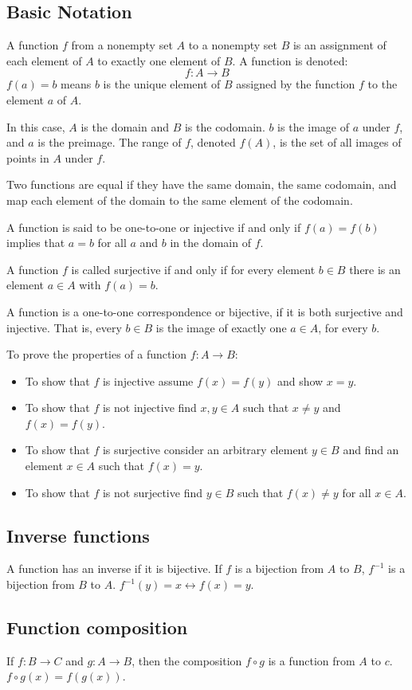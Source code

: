 \subsection{Basic Notation}
A function \(f\) from a nonempty set \(A\) to a nonempty set \(B\) is an assignment of each element of \(A\) to exactly one element of \(B\). A function is denoted:
\begin{equation*}
    f: A \rightarrow B
\end{equation*}
\(f(a) = b\) means \(b\) is the unique element of \(B\) assigned by the function \(f\) to the element \(a\) of \(A\).

In this case, \(A\) is the domain and \(B\) is the codomain. \(b\) is the image of \(a\) under \(f\), and \(a\) is the preimage. The range of \(f\), denoted \(f(A)\), is the set of all images of points in \(A\) under \(f\).

Two functions are equal if they have the same domain, the same codomain, and map each element of the domain to the same element of the codomain.

A function is said to be one-to-one or injective if and only if \(f(a) = f(b)\) implies that \(a = b\) for all \(a\) and \(b\) in the domain of \(f\).

A function \(f\) is called surjective if and only if for every element \(b \in B\) there is an element \(a \in A\) with \(f(a) = b\).

A function is a one-to-one correspondence or bijective, if it is both surjective and injective. That is, every \(b \in B\) is the image of exactly one \(a \in A\), for every \(b\).

To prove the properties of a function \(f: A \rightarrow B\):
\begin{itemize}
    \item To show that \(f\) is injective assume \(f(x) = f(y)\) and show \(x = y\).
    \item To show that \(f\) is not injective find \(x, y \in A\) such that \(x \neq y\) and \(f(x) = f(y)\).
    \item To show that \(f\) is surjective consider an arbitrary element \(y \in B\) and find an element \(x \in A\) such that \(f(x) = y\).
    \item To show that \(f\) is not surjective find \(y \in B\) such that \(f(x) \neq y\) for all \(x \in A\).
\end{itemize}

\subsection{Inverse functions}
A function has an inverse if it is bijective. If \(f\) is a bijection from \(A\) to \(B\), \(f^{-1}\) is a bijection from \(B\) to \(A\). \(f^{-1}(y) = x \leftrightarrow f(x) = y\).

\subsection{Function composition}
If \(f: B \rightarrow C\) and \(g: A \rightarrow B\), then the composition \(f \circ g\) is a function from \(A\) to \(c\). \(f \circ g (x) = f(g(x))\).
